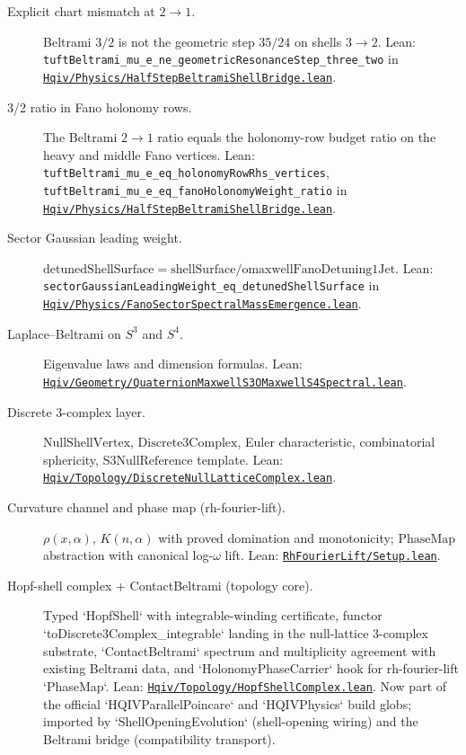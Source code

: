 \documentclass[11pt]{article}
\newcommand{\leanrepo}{https://github.com/HQIV/hqiv-lean/blob/main}
\newcommand{\leanfile}[1]{\href{\leanrepo/#1}{\nolinkurl{#1}}}
\newcommand{\leanid}[1]{\nolinkurl{#1}}
\begin{document}
\begin{description}
\item[\label{lean:chart-mismatch-3-2}Explicit chart mismatch at $2\to1$.]
  Beltrami $3/2$ is not the geometric step $35/24$ on shells $3\to2$.
  Lean: \leanid{tuftBeltrami\_mu\_e\_ne\_geometricResonanceStep\_three\_two}
  in \leanfile{Hqiv/Physics/HalfStepBeltramiShellBridge.lean}.

\item[\label{lean:holonomy-3-2-placement}3/2 ratio in Fano holonomy rows.]
  The Beltrami $2\to1$ ratio equals the holonomy-row budget ratio on
  the heavy and middle Fano vertices. Lean:
  \leanid{tuftBeltrami\_mu\_e\_eq\_holonomyRowRhs\_vertices},
  \leanid{tuftBeltrami\_mu\_e\_eq\_fanoHolonomyWeight\_ratio}
  in \leanfile{Hqiv/Physics/HalfStepBeltramiShellBridge.lean}.

\item[\label{lean:sector-gaussian-weight}Sector Gaussian leading weight.]
  $\mathrm{detunedShellSurface} = \mathrm{shellSurface} /
  \mathrm{omaxwellFanoDetuning1Jet}$. Lean:
  \leanid{sectorGaussianLeadingWeight\_eq\_detunedShellSurface}
  in \leanfile{Hqiv/Physics/FanoSectorSpectralMassEmergence.lean}.

\item[\label{lean:laplace-s3-s4}Laplace--Beltrami on $S^3$ and $S^4$.]
  Eigenvalue laws and dimension formulas. Lean:
  \leanfile{Hqiv/Geometry/QuaternionMaxwellS3OMaxwellS4Spectral.lean}.

\item[\label{lean:discrete-3-complex}Discrete 3-complex layer.]
  $\mathrm{NullShellVertex}$, $\mathrm{Discrete3Complex}$,
  Euler characteristic, combinatorial sphericity, $\mathrm{S3NullReference}$
  template. Lean:
  \leanfile{Hqiv/Topology/DiscreteNullLatticeComplex.lean}.

\item[\label{lean:curvature-channel}Curvature channel and phase map (rh-fourier-lift).]
  $\rho(x,\alpha)$, $K(n,\alpha)$ with proved domination and monotonicity;
  $\mathrm{PhaseMap}$ abstraction with canonical log-$\omega$ lift.
  Lean: \leanfile{RhFourierLift/Setup.lean}.

\item[\label{lean:hopf-shell-complex}Hopf-shell complex + ContactBeltrami (topology core).]
  Typed `HopfShell` with integrable-winding certificate, functor
  `toDiscrete3Complex_integrable` landing in the null-lattice
  3-complex substrate, `ContactBeltrami` spectrum and multiplicity
  agreement with existing Beltrami data, and `HolonomyPhaseCarrier`
  hook for rh-fourier-lift `PhaseMap`. Lean:
  \leanfile{Hqiv/Topology/HopfShellComplex.lean}. Now part of the
  official `HQIVParallelPoincare` and `HQIVPhysics` build globs;
  imported by `ShellOpeningEvolution` (shell-opening wiring) and the Beltrami
  bridge (compatibility transport).


\end{description}
\end{document}
